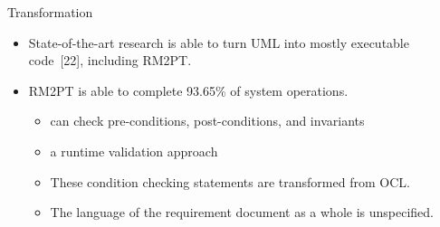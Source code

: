 \documentclass[xcolor=svgnames]{beamer}
\begin{document}
\begin{frame}{Transformation}

\begin{itemize}
\item State-of-the-art research is able to turn UML into mostly executable code~[22], including RM2PT.
\item RM2PT is able to complete 93.65\% of system operations.
\begin{itemize}
\item can check pre-conditions, post-conditions, and invariants
\item a runtime validation approach
\item<2-> These condition checking statements are transformed from OCL.
\item<3-> The language of the requirement document as a whole is unspecified.
\end{itemize}

\end{itemize}

\end{frame}
\end{document}
